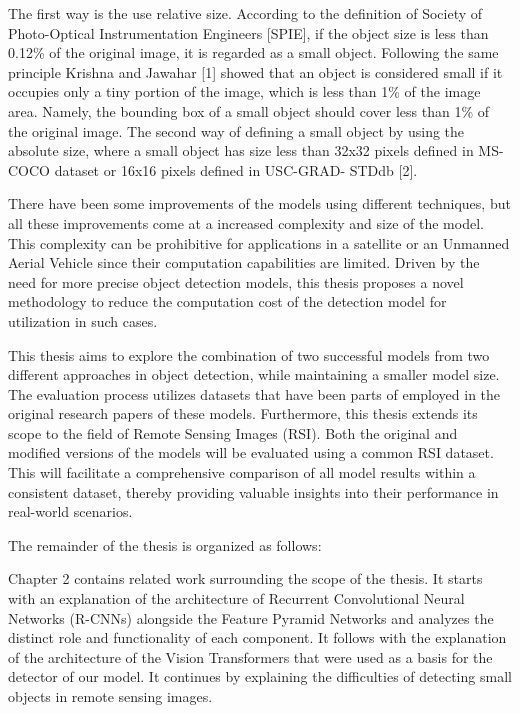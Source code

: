 \newpage
The first way is the use relative size. According to the definition of Society of Photo-Optical 
Instrumentation Engineers [SPIE], if the object size is less than 0.12\% of the original image, it is regarded as a small object. Following the same 
principle Krishna and Jawahar [1] showed that an object is considered small if it occupies only a tiny portion of the image, which is less than 
1\% of the image area. Namely, the bounding box of a small object should cover less than 1\% of the original image. The second way of defining a small 
object by using the absolute size, where a small object has size less than 32x32 pixels defined in MS-COCO dataset or 16x16 pixels defined in 
USC-GRAD- STDdb [2].

There have been some improvements of the models using different techniques, but all these improvements come at a increased complexity and size of the model. 
This complexity can be prohibitive for applications in a satellite or an Unmanned Aerial Vehicle since their computation capabilities are limited. 
Driven by the need for more precise object detection models, this thesis proposes a novel methodology to reduce the computation cost of the detection model 
for utilization in such cases.

This thesis aims to explore the combination of two successful models from two different approaches in object detection, while maintaining a smaller
model size. The evaluation process utilizes datasets that have been parts of employed in the original research papers of these models. 
Furthermore, this thesis extends its scope to the field of Remote Sensing Images (RSI). Both the original and modified versions 
of the models will be evaluated using a common RSI dataset. This will facilitate a comprehensive comparison of all model results within a consistent dataset, 
thereby providing valuable insights into their performance in real-world scenarios.


The remainder of the thesis is organized as follows:

Chapter 2 contains related work surrounding the scope of the thesis. It starts with an explanation of the architecture of Recurrent Convolutional Neural Networks
(R-CNNs) alongside the Feature Pyramid Networks and analyzes the distinct role and functionality of each component. It follows with the explanation of the 
architecture of the Vision Transformers that were used as a basis for the detector of our model. It continues by explaining the difficulties of detecting 
small objects in remote sensing images.

